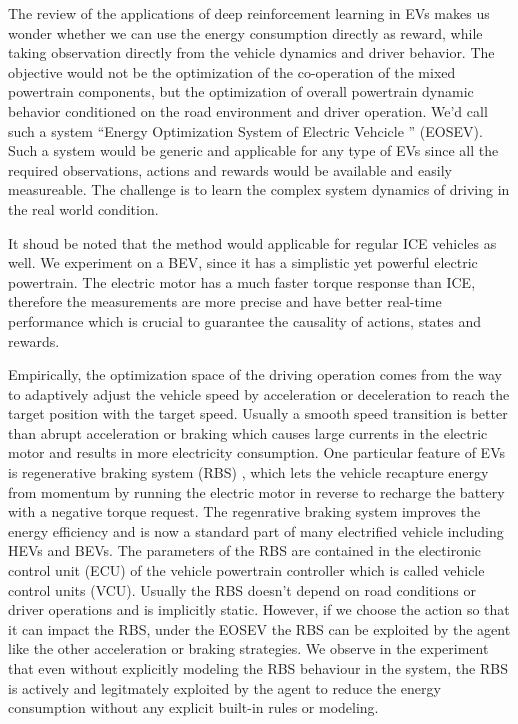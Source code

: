 \documentclass{article}
\begin{document}
The review of the applications of deep reinforcement learning in EVs makes us wonder whether we can use the energy consumption directly as reward, while taking observation directly from the vehicle dynamics and driver behavior. The objective would not be the optimization of the co-operation of the mixed powertrain components, but the optimization of overall powertrain dynamic behavior conditioned on the road environment and driver operation. We'd call such a system ``Energy Optimization System of Electric Vehcicle '' (EOSEV). Such a system would be generic and applicable for any type of EVs since all the required observations, actions and rewards would be available and easily measureable. The challenge is to learn the complex system dynamics of driving in the real world condition.

It shoud be noted that the method would applicable for regular ICE vehicles as well. We experiment on a BEV, since it has a simplistic yet powerful electric powertrain. The electric motor has a much faster torque response than ICE, therefore the measurements are more precise and have better real-time performance which is crucial to guarantee the causality of actions, states and rewards.

Empirically, the optimization space of the driving operation comes from the way to adaptively adjust the vehicle speed by acceleration or deceleration to reach the target position with the target speed. Usually a smooth speed transition is better than abrupt acceleration or braking which causes large currents in the electric motor and results in more electricity consumption. One particular feature of EVs is regenerative braking system (RBS) \parencite{Yang_2024_RBS}, which lets the vehicle recapture energy from momentum by running the electric motor in reverse to recharge the battery with a negative torque request. The regenrative braking system improves the energy efficiency and is now a standard part of many electrified vehicle including HEVs and BEVs. The parameters of the RBS are contained in the electironic control unit (ECU) of the vehicle powertrain controller which is called vehicle control units (VCU). Usually the RBS doesn't depend on road conditions or driver operations and is implicitly static. However, if we choose the action so that it can impact the RBS, under the EOSEV the RBS can be exploited by the agent like the other acceleration or braking strategies. We observe in the experiment that even without explicitly modeling the RBS behaviour in the system, the RBS is actively and legitmately exploited by the agent to reduce the energy consumption without any explicit built-in rules or modeling.
\end{document}
